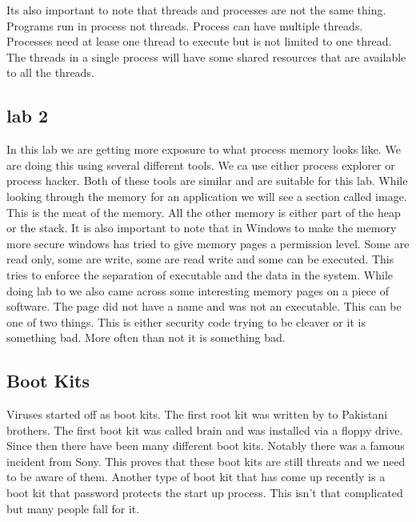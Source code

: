 \documentclass[letterpaper, onecolumn,10pt]{IEEEtran}
\begin{document}
		    Its also important to note that threads and processes are not the same thing. Programs run in process not threads. Process can have multiple threads. Processes need at lease one thread to execute but is not limited to one thread. The threads in a single process will have some shared resources that are available to all the threads.\\
		    
		    \subsection{lab 2}
		    In this lab we are getting more exposure to what process memory looks like. We are doing this using several different tools. We ca use either process explorer or process hacker. Both of these tools are similar and are suitable for this lab. While looking through the memory for an application we will see a section called image. This is the meat of the memory. All the other memory is either part of the heap or the stack. It is also important to note that in Windows to make the memory more secure windows has tried to give memory pages a permission level. Some are read only, some are write, some are read write and some can be executed. This tries to enforce the separation of executable and the data in the system. While doing lab to we also came across some interesting memory pages on a piece of software. The page did not have a name and was not an executable. This can be one of two things. This is either security code trying to be cleaver or it is something bad. More often than not it is something bad.\\
		    
		    \subsection{Boot Kits}
		    Viruses started off as boot kits. The first root kit was written by to Pakistani brothers. The first boot kit was called brain and was installed via a floppy drive. Since then there have been many different boot kits. Notably there was a famous incident from Sony. This proves that these boot kits are still threats and we need to be aware of them. Another type of boot kit that has come up recently is a boot kit that password protects the start up process. This isn't that complicated but many people fall for it.\\
		    
\end{document}
